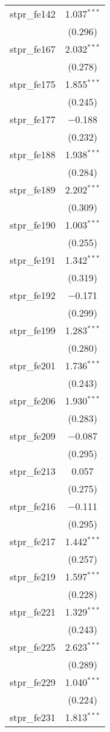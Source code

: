 \begin{table}[!htbp]
\begin{tabular}{@{\extracolsep{5pt}}lc}
  stpr\_fe142 & 1.037$^{***}$ \\ 
  & (0.296) \\ 
  stpr\_fe167 & 2.032$^{***}$ \\ 
  & (0.278) \\ 
  stpr\_fe175 & 1.855$^{***}$ \\ 
  & (0.245) \\ 
  stpr\_fe177 & $-$0.188 \\ 
  & (0.232) \\ 
  stpr\_fe188 & 1.938$^{***}$ \\ 
  & (0.284) \\ 
  stpr\_fe189 & 2.202$^{***}$ \\ 
  & (0.309) \\ 
  stpr\_fe190 & 1.003$^{***}$ \\ 
  & (0.255) \\ 
  stpr\_fe191 & 1.342$^{***}$ \\ 
  & (0.319) \\ 
  stpr\_fe192 & $-$0.171 \\ 
  & (0.299) \\ 
  stpr\_fe199 & 1.283$^{***}$ \\ 
  & (0.280) \\ 
  stpr\_fe201 & 1.736$^{***}$ \\ 
  & (0.243) \\ 
  stpr\_fe206 & 1.930$^{***}$ \\ 
  & (0.283) \\ 
  stpr\_fe209 & $-$0.087 \\ 
  & (0.295) \\ 
  stpr\_fe213 & 0.057 \\ 
  & (0.275) \\ 
  stpr\_fe216 & $-$0.111 \\ 
  & (0.295) \\ 
  stpr\_fe217 & 1.442$^{***}$ \\ 
  & (0.257) \\ 
  stpr\_fe219 & 1.597$^{***}$ \\ 
  & (0.228) \\ 
  stpr\_fe221 & 1.329$^{***}$ \\ 
  & (0.243) \\ 
  stpr\_fe225 & 2.623$^{***}$ \\ 
  & (0.289) \\ 
  stpr\_fe229 & 1.040$^{***}$ \\ 
  & (0.224) \\ 
  stpr\_fe231 & 1.813$^{***}$ \\ 

\end{tabular}
\end{table}
